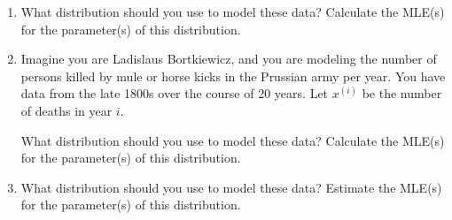 \begin{enumerate}

\item 
\vspace{3mm}

What distribution should you use to model these data? Calculate the MLE(s) for the parameter(s) of this distribution.
\vspace{3mm}

\item Imagine you are Ladislaus Bortkiewicz, and you are modeling the number of persons killed by mule or horse kicks in the Prussian army per year. You have data from the late 1800s over the course of 20 years. Let $x^{(i)}$ be the number of deaths in year $i$.


What distribution should you use to model these data? Calculate the MLE(s) for the parameter(s) of this distribution.
\vspace{3mm}

\item 
\vspace{3mm}

What distribution should you use to model these data? Estimate the MLE(s) for the parameter(s) of this distribution.

\end{enumerate}
